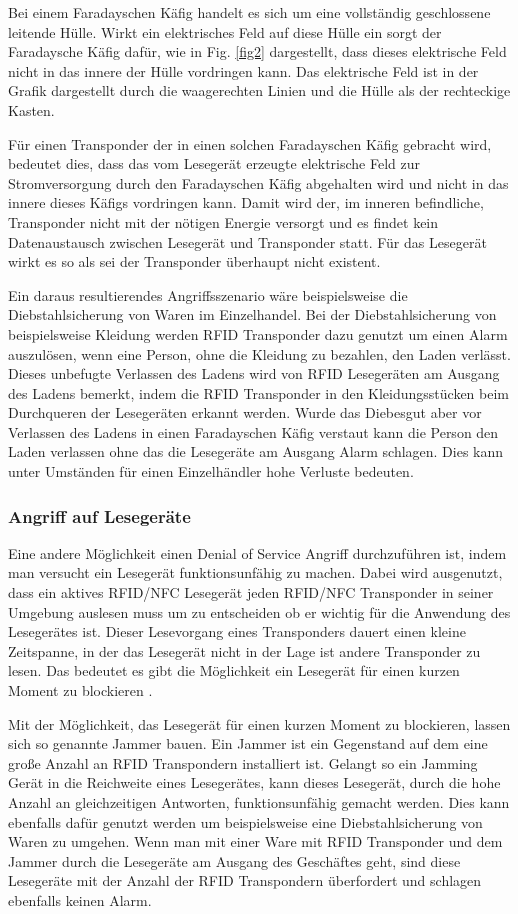 \documentclass[conference]{IEEEtran}
\begin{document}
Bei einem Faradayschen Käfig handelt es sich um eine vollständig geschlossene leitende Hülle. Wirkt ein elektrisches Feld auf diese Hülle ein sorgt der Faradaysche Käfig dafür, wie in Fig. \ref{fig2} dargestellt, dass dieses elektrische Feld nicht in das innere der Hülle vordringen kann. Das elektrische Feld ist in der Grafik dargestellt durch die waagerechten Linien und die Hülle als der rechteckige Kasten.

Für einen Transponder der in einen solchen Faradayschen Käfig gebracht wird, bedeutet dies, dass das vom Lesegerät erzeugte elektrische Feld zur Stromversorgung durch den Faradayschen Käfig abgehalten wird und nicht in das innere dieses Käfigs vordringen kann. Damit wird der, im inneren befindliche, Transponder nicht mit der nötigen Energie versorgt und es findet kein Datenaustausch zwischen Lesegerät und Transponder statt. Für das Lesegerät wirkt es so als sei der Transponder überhaupt nicht existent.

Ein daraus resultierendes Angriffsszenario wäre beispielsweise die Diebstahlsicherung von Waren im Einzelhandel. Bei der Diebstahlsicherung von beispielsweise Kleidung werden RFID Transponder dazu genutzt um einen Alarm auszulösen, wenn eine Person, ohne die Kleidung zu bezahlen, den Laden verlässt. Dieses unbefugte Verlassen des Ladens wird von RFID Lesegeräten am Ausgang des Ladens bemerkt, indem die RFID Transponder in den Kleidungsstücken beim Durchqueren der Lesegeräten erkannt werden. Wurde das Diebesgut aber vor Verlassen des Ladens in einen Faradayschen Käfig verstaut kann die Person den Laden verlassen ohne das die Lesegeräte am Ausgang Alarm schlagen. Dies kann unter Umständen für einen Einzelhändler hohe Verluste bedeuten.

\subsubsection{Angriff auf Lesegeräte}
Eine andere Möglichkeit einen Denial of Service Angriff durchzuführen ist, indem man versucht ein Lesegerät funktionsunfähig zu machen. Dabei wird ausgenutzt, dass ein aktives RFID/NFC Lesegerät jeden RFID/NFC Transponder in seiner Umgebung auslesen muss um zu entscheiden ob er wichtig für die Anwendung des Lesegerätes ist. Dieser Lesevorgang eines Transponders dauert einen kleine Zeitspanne, in der das Lesegerät nicht in der Lage ist andere Transponder zu lesen. Das bedeutet es gibt die Möglichkeit ein Lesegerät für einen kurzen Moment zu blockieren \cite{b3}.

Mit der Möglichkeit, das Lesegerät für einen kurzen Moment zu blockieren, lassen sich so genannte Jammer bauen. Ein Jammer ist ein Gegenstand auf dem eine große Anzahl an RFID Transpondern installiert ist. Gelangt so ein Jamming Gerät in die Reichweite eines Lesegerätes, kann dieses Lesegerät, durch die hohe Anzahl an gleichzeitigen Antworten, funktionsunfähig gemacht werden. Dies kann ebenfalls dafür genutzt werden um beispielsweise eine Diebstahlsicherung von Waren zu umgehen. Wenn man mit einer Ware mit RFID Transponder und dem Jammer durch die Lesegeräte am Ausgang des Geschäftes geht, sind diese Lesegeräte mit der Anzahl der RFID Transpondern überfordert und schlagen ebenfalls keinen Alarm.
\end{document}
